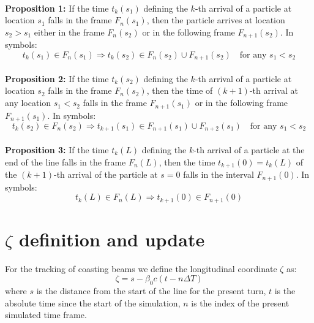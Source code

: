 ~\\
\textbf{Proposition 1:} If the time $t_k(s_1)$ defining the $k$-th arrival of a particle at location $s_1$ falls in the frame $F_n(s_1)$, then the particle arrives at location $s_2 > s_1$ either in the frame $F_n(s_2)$ or in the following frame $F_{n+1}(s_2)$. In symbols:
\begin{equation}
t_k(s_1) \in F_n(s_1) \Rightarrow t_k(s_2) \in F_n(s_2) \cup  F_{n+1}(s_2) \quad \text{for any } s_1 < s_2
\end{equation}
~\\
\textbf{Proposition 2:} If the time $t_k(s_2)$ defining the $k$-th arrival of a particle at location $s_2$ falls in the frame $F_n(s_2)$, then the time of $(k+1)$-th arrival at any location $s_1 < s_2$ falls in the frame $F_{n+1}(s_1)$ or in the following frame $F_{n+1}(s_1)$. In symbols:
\begin{equation}
t_k(s_2) \in F_n(s_2) \Rightarrow t_{k+1}(s_1) \in F_{n+1}(s_1) \cup  F_{n+2}(s_1) \quad \text{for any } s_1 < s_2
\end{equation}
~\\
\textbf{Proposition 3:} If the time $t_k(L)$ defining the $k$-th arrival of a particle at the end of the line falls in the frame $F_n(L)$, then the time $t_{k+1}(0) = t_k(L)$ of the $(k+1)$-th arrival of the particle at $s=0$ falls in the interval
$F_{n+1}(0)$. In symbols:
\begin{equation}
t_k(L) \in F_n(L) \Rightarrow t_{k+1}(0) \in F_{n+1}(0)
\end{equation}

\section{$\zeta$ definition and update}

For the tracking of coasting beams we define the longitudinal coordinate $\zeta$ as:
\begin{equation}
\zeta = s  - \beta_0 c (t - n\Delta T)
\end{equation}
where $s$ is the distance from the start of the line for the present turn, $t$ is the absolute time since the start of the simulation, $n$ is the index of the present simulated time frame.

